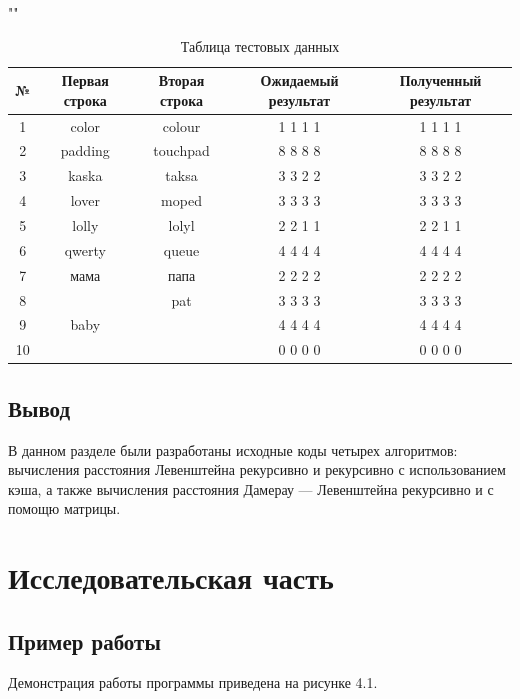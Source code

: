 \documentclass[12pt]{report}
\begin{document}
\begin{table}[h]
	\begin{center}
		\caption{Таблица тестовых данных}
		""\newline
		\begin{tabular}{|c c c c c|} 
			\hline
			№ & Первая строка & Вторая строка & Ожидаемый результат & Полученный результат \\ [0.8ex] 
			\hline
			1 & color & colour & 1 1 1 1 & 1 1 1 1\\
			\hline
			2 & padding & touchpad & 8 8 8 8 & 8 8 8 8\\
			\hline
			3 & kaska & taksa & 3 3 2 2 & 3 3 2 2\\
			\hline
			4 & lover & moped & 3 3 3 3 & 3 3 3 3\\
			\hline
			5 & lolly & lolyl & 2 2 1 1  & 2 2 1 1\\
			\hline
			6 & qwerty & queue & 4 4 4 4 & 4 4 4 4\\
			\hline
			7 & мама & папа & 2 2 2 2 & 2 2 2 2\\
			\hline
			8 &  & pat & 3 3 3 3 & 3 3 3 3\\
			\hline
			9 & baby &  & 4 4 4 4 & 4 4 4 4\\
			\hline
			10 &  &  & 0 0 0 0 & 0 0 0 0\\
			\hline
		\end{tabular}
	\end{center}
\end{table}

\section{Вывод}
В данном разделе были разработаны исходные коды четырех алгоритмов: вычисления расстояния Левенштейна рекурсивно и рекурсивно с использованием кэша, а также вычисления расстояния Дамерау — Левенштейна рекурсивно и с помощю матрицы.

\chapter{Исследовательская часть}

\section{Пример работы}

Демонстрация работы программы приведена на рисунке 4.1.
\end{document}
